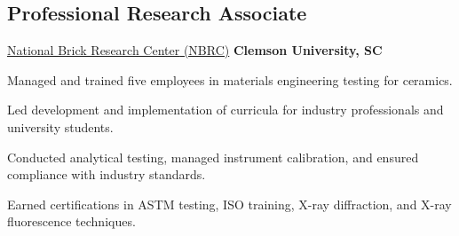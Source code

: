 \subsection{Professional Research Associate}
\begin{cvtable}
        {\color{cvsectioncolor}\href{https://brickandtile.org/}{\underline{National Brick Research Center} (NBRC)}}
        {\textbf{Clemson University, SC}}
        {\begin{tightitemize}
            \item Managed and trained five employees in materials engineering testing for ceramics.
            \item Led development and implementation of curricula for industry professionals and university students.
            \item Conducted analytical testing, managed instrument calibration, and ensured compliance with industry standards.
            \item Earned certifications in ASTM testing, ISO training, X-ray diffraction, and X-ray fluorescence techniques.
        \end{tightitemize}}
\end{cvtable}